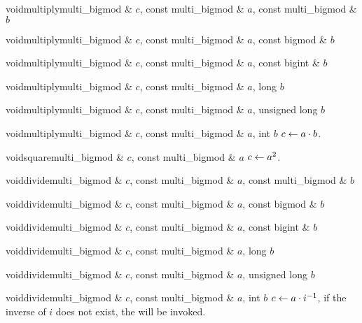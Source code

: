 \begin{fcode}{void}{multiply}{multi_bigmod & $c$, const multi_bigmod & $a$, const multi_bigmod & $b$}\end{fcode}
\begin{fcode}{void}{multiply}{multi_bigmod & $c$, const multi_bigmod & $a$, const bigmod & $b$}\end{fcode}
\begin{fcode}{void}{multiply}{multi_bigmod & $c$, const multi_bigmod & $a$, const bigint & $b$}\end{fcode}
\begin{fcode}{void}{multiply}{multi_bigmod & $c$, const multi_bigmod & $a$, long $b$}\end{fcode}
\begin{fcode}{void}{multiply}{multi_bigmod & $c$, const multi_bigmod & $a$, unsigned long $b$}\end{fcode}
\begin{fcode}{void}{multiply}{multi_bigmod & $c$, const multi_bigmod & $a$, int $b$}
  $c \leftarrow a \cdot b$.
\end{fcode}

\begin{fcode}{void}{square}{multi_bigmod & $c$, const multi_bigmod & $a$}
  $c \leftarrow a^2$.
\end{fcode}

\begin{fcode}{void}{divide}{multi_bigmod & $c$, const multi_bigmod & $a$, const multi_bigmod & $b$}\end{fcode}
\begin{fcode}{void}{divide}{multi_bigmod & $c$, const multi_bigmod & $a$, const bigmod & $b$}\end{fcode}
\begin{fcode}{void}{divide}{multi_bigmod & $c$, const multi_bigmod & $a$, const bigint & $b$}\end{fcode}
\begin{fcode}{void}{divide}{multi_bigmod & $c$, const multi_bigmod & $a$, long $b$}\end{fcode}
\begin{fcode}{void}{divide}{multi_bigmod & $c$, const multi_bigmod & $a$, unsigned long $b$}\end{fcode}
\begin{fcode}{void}{divide}{multi_bigmod & $c$, const multi_bigmod & $a$, int $b$}
  $c \leftarrow a \cdot i^{-1}$, if the inverse of $i$ does not exist, the \LEH will be invoked.
\end{fcode}


